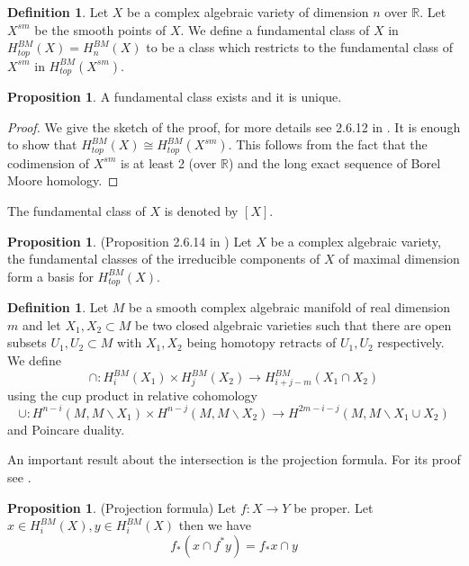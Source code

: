 \documentclass[12pt]{article}
\newcommand{\R}{\mathbb{R}}
\theoremstyle{plain}
\theoremstyle{definition}
\newtheorem{prop}[theorem]{Proposition}
\newtheorem{defn}[theorem]{Definition}
\begin{document}
\begin{defn}
    Let $X$ be a complex algebraic variety of dimension $n$ over $\R$. Let $X^{sm}$ be the smooth points of $X$. We define a fundamental class of $X$ in $H_{top}^{BM}(X)=H_{n}^{BM}(X)$ to be a class which restricts to the fundamental class of $X^{sm}$ in $H_{top}^{BM}(X^{sm})$. 
\end{defn}

\begin{prop}
    A fundamental class exists and it is unique.
\end{prop}

\begin{proof}
    We give the sketch of the proof, for more details see 2.6.12 in \cite{Chriss1997RepresentationTA}. It is enough to show that $H_{top}^{BM}(X)\cong H_{top}^{BM}(X^{sm})$. This follows from the fact that the codimension of $X^{sm}$ is at least 2 (over $\R$) and the long exact sequence of Borel Moore homology.
\end{proof}

The fundamental class of $X$ is denoted by $[X]$.


\begin{prop}\label{basis of top BM}(Proposition 2.6.14 in \cite{Chriss1997RepresentationTA})
    Let $X$ be a complex algebraic variety, the fundamental classes of the irreducible components of $X$ of maximal dimension form a basis for $H_{top}^{BM}(X)$.
\end{prop}

\begin{defn}\label{def:intersection}
    Let $M$ be a smooth complex algebraic manifold of real dimension $m$ and let $X_1,X_2\subset M$ be two closed algebraic varieties such that there are open subsets $U_1,U_2\subset M$ with $X_1,X_2$ being homotopy retracts of $U_1,U_2$ respectively. We define $$\cap:H^{BM}_{i}(X_1)\times H^{BM}_{j}(X_2)\rightarrow H^{BM}_{i+j-m}(X_1\cap X_2)$$ using the cup product in relative cohomology $$\cup:H^{n-i}(M,M\backslash X_1)\times H^{n-j}(M,M\backslash X_2)\rightarrow H^{2m-i-j}(M,M\backslash X_1\cup X_2)$$ and Poincare duality.
\end{defn}

An important result about the intersection is the projection formula. For its proof see \cite{FultonIntersectionTheory}.

\begin{prop}(Projection formula)
    Let $f:X\rightarrow Y$ be proper. Let $x\in H_i^{BM}(X), y\in H_i^{BM}(X)$ then we have $$f_*(x\cap f^*y)=f_*x\cap y$$
\end{prop}
\end{document}
